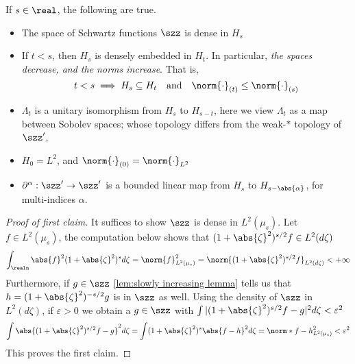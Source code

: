 \documentclass[../main-v2-manifolds.tex]{subfiles}
\begin{document}

\begin{wts}\label{thm:key results sobolev space over complex}
If $s\in \real$, the following are true.
\begin{itemize}
    \item The space of Schwartz functions $\szz$ is dense in $H_s$
    \item If $t < s$, then $H_s$ is densely embedded in $H_t$. In particular, \emph{the spaces decrease, and the norms increase}. That is,
    \[
    t<s\implies H_s\subseteq H_t\quad\text{and}\quad \norm{\cdot}_{(t)}\leq\norm{\cdot}_{(s)}
    \]
    \item $\Lambda_t$ is a unitary isomorphism from $H_s$ to $H_{s-t}$, here we view $\Lambda_t$ as a map between Sobolev spaces; whose topology differs from the weak-$\ast$ topology of $\szz'$,
    \item $H_0 = L^2$, and $\norm{\cdot}_{(0)} = \norm{\cdot}_{L^2}$  
    \item $\partial^\alpha:\szz'\to\szz'$ is a bounded linear map from $H_s$ to $H_{s-\abs{\alpha}}$, for multi-indices $\alpha$.
\end{itemize}
\end{wts}
\begin{proof}[Proof of first claim]
It suffices to show $\szz$ is dense in $L^2(\mu_s)$. Let $f\in L^2(\mu_s)$, the computation below shows that $(1+\abs{\zeta}^2)^{s/2}f\in L^2(d\zeta)$
\[
\int_{\realn}\abs{f}^2 (1+\abs{\zeta}^2)^{s}d\zeta = \norm{f}^2_{L^2(\mu_s)} = \norm{(1+\abs{\zeta}^2)^{s/2} f}_{L^2(d\zeta)}<+\infty
\]
Furthermore, if $g\in \szz$ \cref{lem:slowly increasing lemma} tells us that $h = (1+\abs{\zeta}^2)^{-s/2}g$ is in $\szz$ as well. Using the density of $\szz$ in $L^2(d\zeta)$, if $\varepsilon>0$ we obtain a $g\in\szz$ with $\int \vert (1+\abs{\zeta}^2)^{s/2}f - g\vert^2d\zeta < \varepsilon^2$
\[
\int \abs{(1+\abs{\zeta}^2)^{s/2}f - g}^2d\zeta = \int (1+\abs{\zeta}^2)^{s} \abs{f-h}^2 d\zeta=\norm*{f-h}_{L^2(\mu_s)}^2 < \varepsilon^2
\]
This proves the first claim. 
\end{proof}
\end{document}
